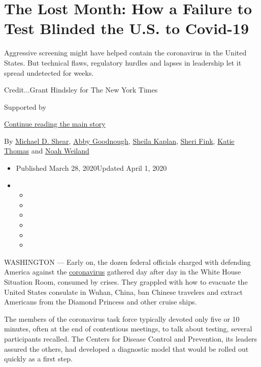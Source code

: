 \hypertarget{the-lost-month-how-a-failure-to-test-blinded-the-us-to-covid-19}{%
\section{The Lost Month: How a Failure to Test Blinded the U.S. to
Covid-19}\label{the-lost-month-how-a-failure-to-test-blinded-the-us-to-covid-19}}

Aggressive screening might have helped contain the coronavirus in the
United States. But technical flaws, regulatory hurdles and lapses in
leadership let it spread undetected for weeks.

Credit...Grant Hindsley for The New York Times

Supported by

\protect\hyperlink{after-sponsor}{Continue reading the main story}

By \href{https://www.nytimes3xbfgragh.onion/by/michael-d-shear}{Michael
D. Shear},
\href{https://www.nytimes3xbfgragh.onion/by/abby-goodnough}{Abby
Goodnough},
\href{https://www.nytimes3xbfgragh.onion/by/sheila-kaplan}{Sheila
Kaplan}, \href{https://www.nytimes3xbfgragh.onion/by/sheri-fink}{Sheri
Fink}, \href{https://www.nytimes3xbfgragh.onion/by/katie-thomas}{Katie
Thomas} and
\href{https://www.nytimes3xbfgragh.onion/by/noah-weiland}{Noah Weiland}

\begin{itemize}
\item
  Published March 28, 2020Updated April 1, 2020
\item
  \begin{itemize}
  \item
  \item
  \item
  \item
  \item
  \item
  \end{itemize}
\end{itemize}

WASHINGTON --- Early on, the dozen federal officials charged with
defending America against the
\href{https://www.nytimes3xbfgragh.onion/2020/04/01/us/politics/coronavirus-trump.html}{coronavirus}
gathered day after day in the White House Situation Room, consumed by
crises. They grappled with how to evacuate the United States consulate
in Wuhan, China, ban Chinese travelers and extract Americans from the
Diamond Princess and other cruise ships.

The members of the coronavirus task force typically devoted only five or
10 minutes, often at the end of contentious meetings, to talk about
testing, several participants recalled. The Centers for Disease Control
and Prevention, its leaders assured the others, had developed a
diagnostic model that would be rolled out quickly as a first step.

